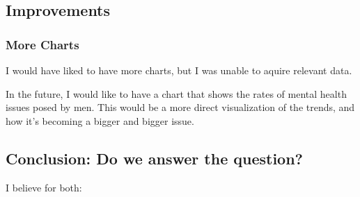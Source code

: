\documentclass{article}
\begin{document}
\subsection{Improvements}
\label{subsec:Improvements}

\subsubsection{More Charts}
\label{subsubsec:Champion Image}

I would have liked to have more charts, but I was unable to aquire relevant data.

In the future, I would like to have a chart that shows the rates of mental
health issues posed by men. This would be a more direct visualization of the
trends, and how it's becoming a bigger and bigger issue. 

\subsection{Conclusion: Do we answer the question?}
\label{subsec:Conclusion}

I believe for both:


\begin{refcontext}[sorting=nyt]
\printbibliography
\end{refcontext}
\end{document}
